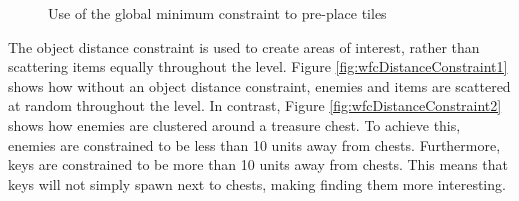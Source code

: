 \begin{figure}[H]
    \centering
    \hfill
    \caption{Use of the global minimum constraint to pre-place tiles \cite{WFC_Automatic_Rules_And_Better_Symmetries}}
    \label{fig:wfcMinimumConstraint}
\end{figure}

The object distance constraint is used to create areas of interest, rather than scattering items equally throughout the level. Figure \ref{fig:wfcDistanceConstraint1} shows how without an object distance constraint, enemies and items are scattered at random throughout the level. In contrast, Figure \ref{fig:wfcDistanceConstraint2} shows how enemies are clustered around a treasure chest. To achieve this, enemies are constrained to be less than 10 units away from chests. Furthermore, keys are constrained to be more than 10 units away from chests. This means that keys will not simply spawn next to chests, making finding them more interesting.


